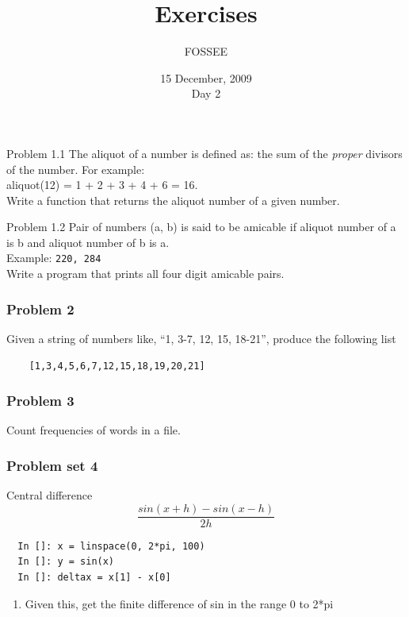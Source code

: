 \documentclass[14pt,compress]{beamer}
\title[Exercises]{Exercises}
\author[FOSSEE] {FOSSEE}
\institute[IIT Bombay] {Department of Aerospace Engineering\\IIT Bombay}
\date[] {15 December, 2009\\Day 2}
\newcounter{time}
\newcommand{\inctime}[1]{\addtocounter{time}{#1}{\tiny \thetime\ m}}
\begin{document}
\begin{frame}
  \titlepage
\end{frame}

\begin{frame}{Problem 1.1}
  The aliquot of a number is defined as: the sum of the \emph{proper} divisors of the number. For example:\\
aliquot(12) = 1 + 2 + 3 + 4 + 6 = 16.\\
  Write a function that returns the aliquot number of a given number. 
\end{frame}

\begin{frame}{Problem 1.2}
  Pair of numbers (a, b) is said to be \alert{amicable} if aliquot number of a is b and aliquot number of b is a.\\
  Example: \texttt{220, 284}\\
  Write a program that prints all four digit amicable pairs.
  
\inctime{20}
\end{frame}



\begin{frame}[fragile]
  \frametitle{Problem 2}
  Given a string of numbers like, ``1, 3-7, 12, 15, 18-21'', produce the following list \\
  \begin{lstlisting}
    [1,3,4,5,6,7,12,15,18,19,20,21]
  \end{lstlisting}
\inctime{10}
\end{frame}

\begin{frame} 
  \frametitle{Problem 3}
  Count frequencies of words in a file.
\inctime{25}
\end{frame}

\begin{frame}[fragile]
  \frametitle{Problem set 4}
  Central difference
  \begin{equation*}
  \frac{sin(x+h)-sin(x-h)}{2h}
  \end{equation*}
  \begin{lstlisting}
  In []: x = linspace(0, 2*pi, 100)
  In []: y = sin(x)
  In []: deltax = x[1] - x[0]
  \end{lstlisting}
  \pause
    \begin{enumerate}
      \item Given this, get the finite difference of sin in the range 0 to 2*pi
    \end{enumerate}
\end{frame}
\end{document}
